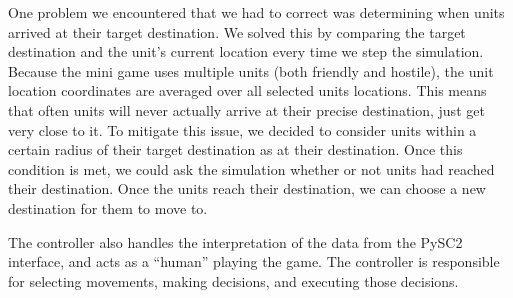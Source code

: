 \documentclass{article}
\begin{document}

One problem we encountered that we had to correct was determining when units
arrived at their target destination.  We solved this by comparing the target
destination and the unit's current location every time we step the simulation.
Because the mini game uses multiple units (both friendly and hostile), the unit
location coordinates are averaged over all selected units locations.  This means
that often units will never actually arrive at their precise destination, just
get very close to it. To mitigate this issue, we decided to consider units
within a certain radius of their target destination as at their destination.
Once this condition is met, we could ask the simulation whether or not units had
reached their destination. Once the units reach their destination, we can choose
a new destination for them to move to.


The controller also handles the interpretation of the data from the PySC2 interface, and acts as a ``human'' playing the game. The controller is responsible for selecting movements, making decisions, and executing those decisions.
\end{document}
